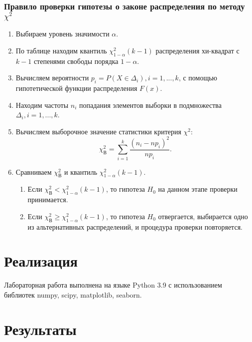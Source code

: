 \documentclass[a4paper,12pt]{article} %
\begin{document}
\subsubsection*{Правило проверки гипотезы о законе распределения по методу $\chi^2$}
\begin{enumerate}
    \item Выбираем уровень значимости $\alpha$.
    \item По таблице \cite[с. 358]{book1} находим квантиль $\chi_{1-\alpha}^2(k-1)$ распределения хи-квадрат с $k-1$ степенями свободы порядка $1-\alpha$.
    \item Вычисляем вероятности $p_i=P(X\in\Delta_i), i = 1,...,k$, с помощью гипотетической функции распределения $F(x)$.
    \item Находим частоты $n_i$ попадания элементов выборки в подмножества $\Delta_i,i=1,...,k$.
    \item Вычисляем выборочное значение статистики критерия $\chi^2$:
        \begin{equation*}
            \chi^2_{\text{В}}=\sum_{i=1}^k\frac{(n_i-np_i)^2}{np_i}.
        \end{equation*}
    \item Сравниваем $\chi^2_{\text{В}}$ и квантиль $\chi_{1-\alpha}^2(k-1)$.
        \begin{enumerate}
            \item Если $\chi^2_{\text{В}}<\chi_{1-\alpha}^2(k-1)$, то гипотеза $H_0$ на данном этапе проверки принимается.
            \item Если $\chi^2_{\text{В}}\geq\chi_{1-\alpha}^2(k-1)$, то гипотеза $H_0$ отвергается, выбирается одно из альтернативных распределений, и процедура проверки повторяется.

        \end{enumerate}
\end{enumerate}

\section{Реализация}
Лабораторная работа выполнена на языке Python 3.9 с использованием библиотек numpy, scipy, matplotlib, seaborn.
\section{Результаты}
\end{document}
